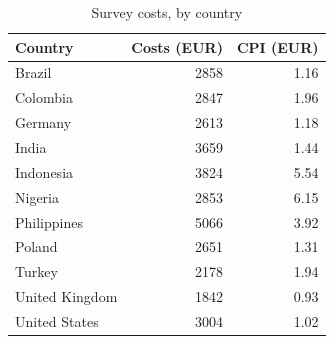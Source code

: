 \begin{table}

\caption{\label{tab:survey-costs}Survey costs, by country}
\centering
\begin{tabular}[t]{lrr}
\toprule
\textbf{Country} & \textbf{Costs (EUR)} & \textbf{CPI (EUR)}\\
\midrule
Brazil & 2858 & 1.16\\
Colombia & 2847 & 1.96\\
Germany & 2613 & 1.18\\
India & 3659 & 1.44\\
Indonesia & 3824 & 5.54\\
Nigeria & 2853 & 6.15\\
Philippines & 5066 & 3.92\\
Poland & 2651 & 1.31\\
Turkey & 2178 & 1.94\\
United Kingdom & 1842 & 0.93\\
United States & 3004 & 1.02\\
\bottomrule
\end{tabular}
\end{table}
